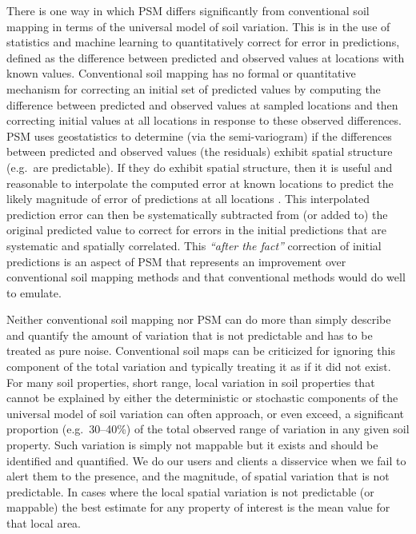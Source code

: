 \documentclass[graybox,natbib,nospthms,UStrade]{svmono}
\begin{document}
There is one way in which PSM differs significantly from
conventional soil mapping in terms of the universal model of soil
variation. This is in the use of statistics and machine learning to
quantitatively correct for error in predictions, defined as the
difference between predicted and observed values at locations with known
values. Conventional soil mapping has no formal or quantitative
mechanism for correcting an initial set of predicted values by computing
the difference between predicted and observed values at sampled
locations and then correcting initial values at all locations in
response to these observed differences. PSM uses
geostatistics to determine (via the semi-variogram) if the differences between predicted and
observed values (the residuals) exhibit spatial structure (e.g.~are
predictable). If they do exhibit spatial structure, then it is useful
and reasonable to interpolate the computed error at known locations to
predict the likely magnitude of error of predictions at all locations
\citep{hengl2007regression}. This interpolated prediction error can then be
systematically subtracted from (or added to) the original predicted
value to correct for errors in the initial predictions that are
systematic and spatially correlated. This \emph{``after the fact''} correction
of initial predictions is an aspect of PSM that
represents an improvement over conventional soil mapping methods and
that conventional methods would do well to emulate.

Neither conventional soil mapping nor PSM can do more
than simply describe and quantify the amount of variation that is not
predictable and has to be treated as pure noise. Conventional soil maps
can be criticized for ignoring this component of the total variation and
typically treating it as if it did not exist. For many soil properties,
short range, local variation in soil properties that cannot be explained
by either the deterministic or stochastic components of the universal
model of soil variation can often approach, or even exceed, a significant proportion (e.g.~30--40\%) of the
total observed range of variation in any given soil property. Such
variation is simply not mappable but it exists and should be identified
and quantified. We do our users and clients a disservice when we fail to
alert them to the presence, and the magnitude, of spatial variation that
is not predictable. In cases where the local spatial variation is not
predictable (or mappable) the best estimate for any property of interest
is the mean value for that local area.
\end{document}

